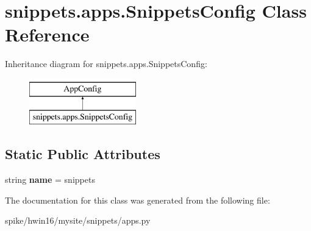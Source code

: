 \hypertarget{classsnippets_1_1apps_1_1_snippets_config}{}\section{snippets.\+apps.\+Snippets\+Config Class Reference}
\label{classsnippets_1_1apps_1_1_snippets_config}
Inheritance diagram for snippets.\+apps.\+Snippets\+Config\+:\begin{figure}[H]
\begin{center}
\leavevmode
\includegraphics[height=2.000000cm]{classsnippets_1_1apps_1_1_snippets_config}
\end{center}
\end{figure}
\subsection*{Static Public Attributes}
\begin{DoxyCompactItemize}
\item 
\mbox{\label{classsnippets_1_1apps_1_1_snippets_config_a78c4db1363915d3f9f12b28184eb8248}} 
string {\bfseries name} = \textquotesingle{}snippets\textquotesingle{}
\end{DoxyCompactItemize}


The documentation for this class was generated from the following file\+:\begin{DoxyCompactItemize}
\item 
spike/hwin16/mysite/snippets/apps.\+py\end{DoxyCompactItemize}
